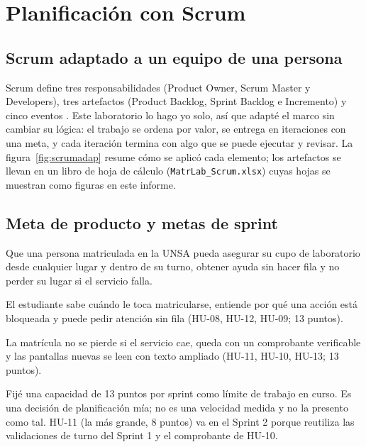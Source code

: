 \section{Planificación con Scrum}
\label{sec:scrum}

\subsection{Scrum adaptado a un equipo de una persona}
Scrum define tres responsabilidades (Product Owner, Scrum Master y Developers), tres artefactos (Product Backlog, Sprint Backlog e Incremento) y cinco eventos \cite{scrumguide}. Este laboratorio lo hago yo solo, así que adapté el marco sin cambiar su lógica: el trabajo se ordena por valor, se entrega en iteraciones con una meta, y cada iteración termina con algo que se puede ejecutar y revisar. La figura~\ref{fig:scrumadap} resume cómo se aplicó cada elemento; los artefactos se llevan en un libro de hoja de cálculo (\texttt{MatrLab\_Scrum.xlsx}) cuyas hojas se muestran como figuras en este informe.



\subsection{Meta de producto y metas de sprint}
\begin{description}[leftmargin=0pt]
	\item[Meta de producto.] Que una persona matriculada en la UNSA pueda asegurar su cupo de laboratorio desde cualquier lugar y dentro de su turno, obtener ayuda sin hacer fila y no perder su lugar si el servicio falla.
	\item[Meta del Sprint 1.] El estudiante sabe cuándo le toca matricularse, entiende por qué una acción está bloqueada y puede pedir atención sin fila (HU-08, HU-12, HU-09; 13 puntos).
	\item[Meta del Sprint 2.] La matrícula no se pierde si el servicio cae, queda con un comprobante verificable y las pantallas nuevas se leen con texto ampliado (HU-11, HU-10, HU-13; 13 puntos).
\end{description}

Fijé una capacidad de 13 puntos por sprint como límite de trabajo en curso. Es una decisión de planificación mía; no es una velocidad medida y no la presento como tal. HU-11 (la más grande, 8 puntos) va en el Sprint 2 porque reutiliza las validaciones de turno del Sprint 1 y el comprobante de HU-10.

